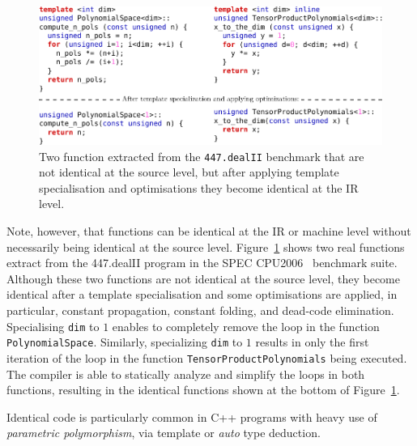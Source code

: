 \begin{figure}[h]
\centering
\includegraphics[scale=0.9]{src/relatedwork/figs/identical-example}
\caption{Two function extracted from the \texttt{447.dealII} benchmark that are not identical at the source level, but after applying template specialisation and optimisations they become identical at the IR level.}
\label{fig:identical-example}
\end{figure}

Note, however, that functions can be identical at the IR or machine level without necessarily being identical at the source level.
Figure~\ref{fig:identical-example} shows two real functions extract from the
447.dealII program in the SPEC CPU2006~\cite{spec} benchmark suite.
Although these two functions are not identical at the source level, they become
identical after a template specialisation and some optimisations are applied, in
particular, constant propagation, constant folding, and dead-code elimination. 
Specialising \verb|dim| to $1$ enables to completely remove the loop in the
function \verb|PolynomialSpace|.
Similarly, specializing \verb|dim| to $1$ results in only the first iteration
of the loop in the function \verb|TensorProductPolynomials| being executed.
The compiler is able to statically analyze and simplify the loops in both
functions, resulting in the identical functions shown at the bottom of
Figure~\ref{fig:identical-example}.

Identical code is particularly common in C++ programs
with heavy use of \textit{parametric polymorphism}, via template or \textit{auto} type deduction.












%
%

